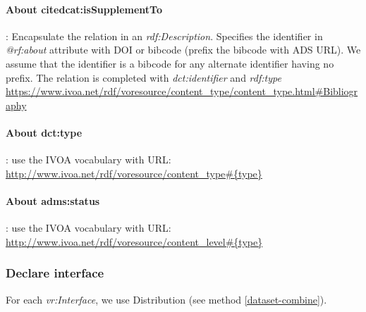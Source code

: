 \documentclass[11pt,a4paper]{ivoa}
\begin{document}
\paragraph{About citedcat:isSupplementTo}:
Encapsulate the relation in an \textit{rdf:Description}. Specifies the identifier in \textit{@rf:about} attribute with DOI or bibcode (prefix the bibcode with ADS URL). We assume that the identifier is a bibcode for any alternate identifier having no prefix.
The relation is completed with \textit{dct:identifier} and  \textit{rdf:type} \url{https://www.ivoa.net/rdf/voresource/content_type/content_type.html#Bibliography}

\paragraph{About dct:type}: use the IVOA vocabulary with URL: \url{http://www.ivoa.net/rdf/voresource/content_type#{type}}

\paragraph{About adms:status}: use the IVOA vocabulary with URL: \url{http://www.ivoa.net/rdf/voresource/content_level#{type}}



\subsubsection{Declare interface}
For each \textit{vr:Interface}, we use Distribution (see method \ref{dataset-combine}).
\end{document}
